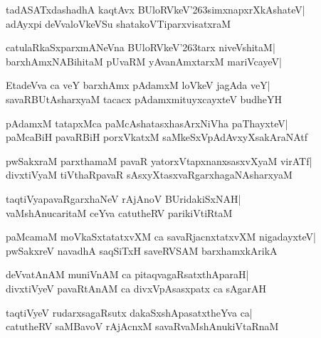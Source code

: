 \documentclass[twoside,12pt,openright]{book}
\def\S{\char'263}
\newcounter{shloka}[chapter]
\begin{document}
\begin{shloka}%
tadASATxdashadhA kaqtAvx BUloRVkeV\S simxnapxrXkAshateV|\\
adAyxpi deVvaloVkeVSu shatakoVTiparxvisatxraM
\end{shloka}

\begin{shloka}%
catulaRkaSxparxmANeVna BUloRVkeV\S tarx niveVshitaM|\\
barxhAmxNABihitaM pUvaRM yAvanAmxtarxM mariVcayeV|
\end{shloka}

\begin{shloka}%
EtadeVva ca veY barxhAmx pAdamxM loVkeV jagAda veY|\\
savaRBUtAsharxyaM tacacx pAdamxmituyxcayxteV budheYH
\end{shloka}

\begin{shloka}%
pAdamxM tatapxMca paMcAshatasxhasArxNiVha paThayxteV|\\
paMcaBiH pavaRBiH porxVkatxM saMkeSxVpAdAvxyXsakAraNAtf
\end{shloka}

\begin{shloka}%
pwSakxraM parxthamaM pavaR yatorxVtapxnanxsasxvXyaM virATf|\\
divxtiVyaM tiVthaRpavaR sAsxyXtasxvaRgarxhagaNAsharxyaM 
\end{shloka}

\begin{shloka}%
taqtiVyapavaRgarxhaNeV rAjAnoV BUridakiSxNAH|\\
vaMshAnucaritaM ceYva catutheRV parikiVtiRtaM
\end{shloka}

\begin{shloka}%
paMcamaM moVkaSxtatatxvXM ca savaRjacnxtatxvXM nigadayxteV|\\
pwSakxreV navadhA saqSiTxH saveRVSAM barxhamxkArikA
\end{shloka}

\begin{shloka}%
deVvatAnAM muniVnAM ca pitaqvagaRsatxthAparaH|\\
divxtiVyeV pavaRtAnAM ca divxVpAsasxpatx ca sAgarAH
\end{shloka}

\begin{shloka}%
taqtiVyeV rudarxsagaRsutx dakaSxshApasatxtheYva ca|\\
catutheRV saMBavoV rAjAcnxM savaRvaMshAnukiVtaRnaM
\end{shloka}
\end{document}
